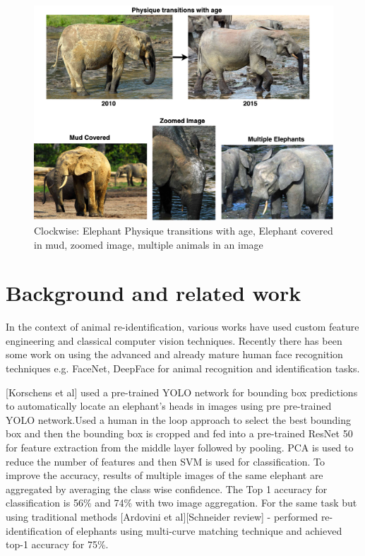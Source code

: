 \documentclass[10pt,twocolumn,letterpaper]{article}
\begin{document}
\begin{figure}[t]
  \centering
  \includegraphics[scale=0.2]{challenges}
   \caption{Clockwise: Elephant Physique transitions with age, Elephant covered in mud, zoomed image, multiple animals in an image}
   \label{fig:challenges}
\end{figure}



\section{Background and related work}
\label{sec:backgoround}

In the context of animal re-identification, various works have used custom feature engineering and classical computer vision techniques. Recently there has been some work on using the advanced and already mature human face recognition techniques e.g. FaceNet, DeepFace for animal recognition and identification tasks.

[Korschens et al] used a pre-trained YOLO network for bounding box predictions to automatically locate an elephant's heads in images using pre pre-trained YOLO network.Used a human in the loop approach to select the best bounding box and then the bounding box is cropped and fed into a pre-trained ResNet 50 for feature extraction from the middle layer followed by pooling. PCA is used to reduce the number of features and then SVM is used for classification. To improve the accuracy, results of multiple images of the same elephant are aggregated by averaging the class wise confidence. The Top 1 accuracy for classification is 56\% and 74\% with two image aggregation. For the same task but using traditional methods [Ardovini et al][Schneider review] - performed re-identification of elephants using multi-curve matching technique and achieved top-1 accuracy for 75\%.
\end{document}
